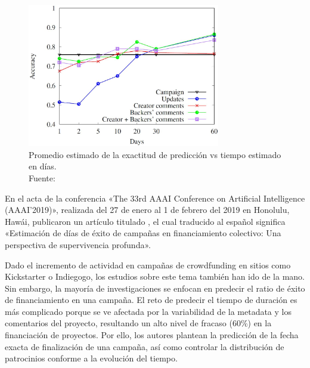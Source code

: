 \begin{figure}[!ht]
	\begin{center}
		\includegraphics[width=0.75\textwidth]{2/figures/lee2018.jpg}
		\caption[Promedio estimado de la exactitud de predicción vs tiempo estimado en días]{Promedio estimado de la exactitud de predicción vs tiempo estimado en días.\\
			Fuente: \cite{pr_lee2018contentDL}}
		\label{2:fig123}
	\end{center}
\end{figure}

\newpage
En el acta de la conferencia «The 33rd AAAI Conference on Artificial Intelligence (AAAI'2019)», realizada del 27 de enero al 1 de febrero del 2019 en Honolulu, Hawái, \cite{pr_jin2019dayssuccess} publicaron un artículo titulado , el cual traducido al español significa «Estimación de días de éxito de campañas en financiamiento colectivo: Una perspectiva de supervivencia profunda».

Dado el incremento de actividad en campañas de crowdfunding en sitios como Kickstarter o Indiegogo, los estudios sobre este tema también han ido de la mano. Sin embargo, la mayoría de investigaciones se enfocan en predecir el ratio de éxito de financiamiento en una campaña. El reto de predecir el tiempo de duración es más complicado porque se ve afectada por la variabilidad de la metadata y los comentarios del proyecto, resultando un alto nivel de fracaso (60\%) en la financiación de proyectos. Por ello, los autores plantean la predicción de la fecha exacta de finalización de una campaña, así como controlar la distribución de patrocinios conforme a la evolución del tiempo.

